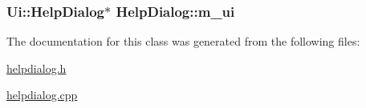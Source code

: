 \hypertarget{class_help_dialog_4c28b4e05b03e891e45dccb0709c0b51}{
\subsubsection[{m\_\-ui}]{\setlength{\rightskip}{0pt plus 5cm}Ui::HelpDialog$\ast$ {\bf HelpDialog::m\_\-ui}}}
\label{class_help_dialog_4c28b4e05b03e891e45dccb0709c0b51}




The documentation for this class was generated from the following files:\begin{CompactItemize}
\item 
\hyperlink{helpdialog_8h}{helpdialog.h}\item 
\hyperlink{helpdialog_8cpp}{helpdialog.cpp}\end{CompactItemize}
